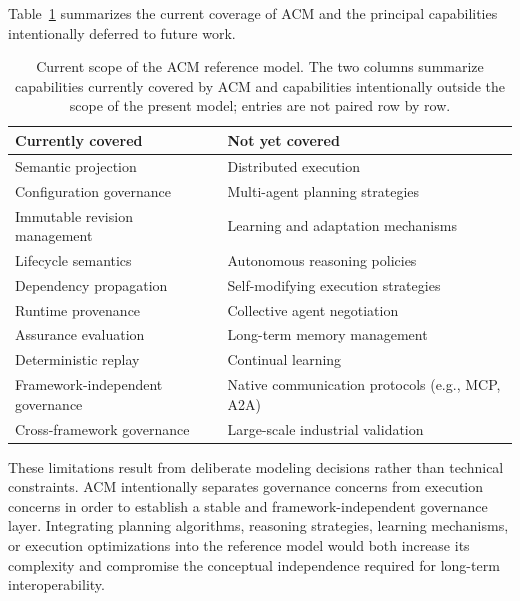 \documentclass[10pt]{article}
\begin{document}
Table~\ref{tab:limitations_scope} summarizes the current coverage of ACM and the principal capabilities intentionally deferred to future work.

\begin{table}[t]
	\caption{Current scope of the ACM reference model. The two columns summarize capabilities currently covered by ACM and capabilities intentionally outside the scope of the present model; entries are not paired row by row.}
	\label{tab:limitations_scope}
	\centering
	\begin{tabular}{ll}
		
		\toprule
		
		Currently covered &
		Not yet covered \\
		
		\midrule
		
		Semantic projection &
		Distributed execution \\
		
		Configuration governance &
		Multi-agent planning strategies \\
		
		Immutable revision management &
		Learning and adaptation mechanisms \\
		
		Lifecycle semantics &
		Autonomous reasoning policies \\
		
		Dependency propagation &
		Self-modifying execution strategies \\
		
		Runtime provenance &
		Collective agent negotiation \\
		
		Assurance evaluation &
		Long-term memory management \\
		
		Deterministic replay &
		Continual learning \\
		
		Framework-independent governance &
		Native communication protocols (e.g., MCP, A2A) \\
		
		Cross-framework governance &
		Large-scale industrial validation \\
		
		\bottomrule
		
	\end{tabular}
	
	\end{table}

These limitations result from deliberate modeling decisions rather than technical constraints. ACM intentionally separates governance concerns from execution concerns in order to establish a stable and framework-independent governance layer. Integrating planning algorithms, reasoning strategies, learning mechanisms, or execution optimizations into the reference model would both increase its complexity and compromise the conceptual independence required for long-term interoperability.
\end{document}
